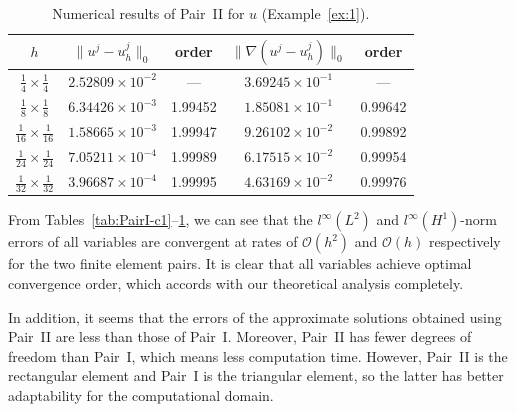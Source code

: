 \begin{table}[htbp]
\centering
\caption{Numerical results of Pair~II for $u$ (Example~\ref{ex:1}).}
\label{tab:PairII-u}
\begin{tabular}{ccccc}
\hline
$h$ &
$\|u^{j} - u_{h}^{j}\|_{0}$ & order &
$\|\nabla(u^{j} - u_{h}^{j})\|_{0}$ & order \\
\hline
$\tfrac{1}{4} \times \tfrac{1}{4}$   & $2.52809\times10^{-2}$ & ---     & $3.69245\times10^{-1}$ & ---     \\
$\tfrac{1}{8} \times \tfrac{1}{8}$   & $6.34426\times10^{-3}$ & 1.99452 & $1.85081\times10^{-1}$ & 0.99642 \\
$\tfrac{1}{16}\times \tfrac{1}{16}$  & $1.58665\times10^{-3}$ & 1.99947 & $9.26102\times10^{-2}$ & 0.99892 \\
$\tfrac{1}{24}\times \tfrac{1}{24}$  & $7.05211\times10^{-4}$ & 1.99989 & $6.17515\times10^{-2}$ & 0.99954 \\
$\tfrac{1}{32}\times \tfrac{1}{32}$  & $3.96687\times10^{-4}$ & 1.99995 & $4.63169\times10^{-2}$ & 0.99976 \\
\hline
\end{tabular}
\end{table}

From Tables~\ref{tab:PairI-c1}--\ref{tab:PairII-u}, we can see that the $l^{\infty}(L^{2})$
and $l^{\infty}(H^{1})$-norm errors of all variables are convergent at rates of
$\mathcal{O}(h^{2})$ and $\mathcal{O}(h)$ respectively for the two finite element pairs. It
is clear that all variables achieve optimal convergence order, which accords with our
theoretical analysis completely.

In addition, it seems that the errors of the approximate solutions obtained using Pair~II are
less than those of Pair~I. Moreover, Pair~II has fewer degrees of freedom than Pair~I, which
means less computation time. However, Pair~II is the rectangular element and Pair~I is the
triangular element, so the latter has better adaptability for the computational domain.

